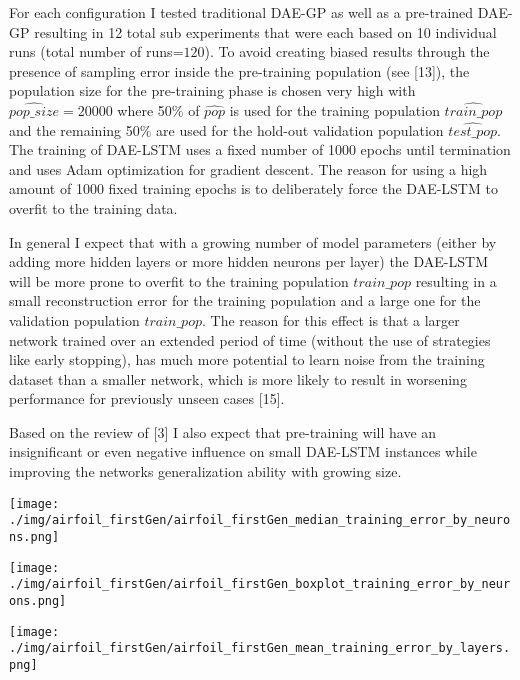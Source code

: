 \documentclass[
  11pt,
]{article}
\let\origfigure\figure
\let\endorigfigure\endfigure
\renewenvironment{figure}[1][2] {
    \expandafter\origfigure\expandafter[H]
} {
    \endorigfigure
}
\begin{document}
For each configuration I tested traditional DAE-GP as well as a
pre-trained DAE-GP resulting in 12 total sub experiments that were each
based on 10 individual runs (total number of runs=\(120\)). To avoid
creating biased results through the presence of sampling error inside
the pre-training population (see {[}13{]}), the population size for the
pre-training phase is chosen very high with \(\hat{pop\_size}=20000\)
where 50\% of \(\hat{pop}\) is used for the training population
\(\hat{train\_pop}\) and the remaining 50\% are used for the hold-out
validation population \(\hat{test\_pop}\). The training of DAE-LSTM uses
a fixed number of 1000 epochs until termination and uses Adam
optimization for gradient descent. The reason for using a high amount of
1000 fixed training epochs is to deliberately force the DAE-LSTM to
overfit to the training data.

In general I expect that with a growing number of model parameters
(either by adding more hidden layers or more hidden neurons per layer)
the DAE-LSTM will be more prone to overfit to the training population
\(train\_pop\) resulting in a small reconstruction error for the
training population and a large one for the validation population
\(train\_pop\). The reason for this effect is that a larger network
trained over an extended period of time (without the use of strategies
like early stopping), has much more potential to learn noise from the
training dataset than a smaller network, which is more likely to result
in worsening performance for previously unseen cases {[}15{]}.

Based on the review of {[}3{]} I also expect that pre-training will have
an insignificant or even negative influence on small DAE-LSTM instances
while improving the networks generalization ability with growing size.

\begin{figure}
\centering
\texttt{[image: ./img/airfoil\_firstGen/airfoil\_firstGen\_median\_training\_error\_by\_neurons.png]}
\caption{Airfoil - First Generation Median Training Error for variable
number of hidden Neurons}
\end{figure}

\begin{figure}
\centering
\texttt{[image: ./img/airfoil\_firstGen/airfoil\_firstGen\_boxplot\_training\_error\_by\_neurons.png]}
\caption{Airfoil - First Generation final Training Error for variable
number of hidden Neurons}
\end{figure}

\begin{figure}
\centering
\texttt{[image: ./img/airfoil\_firstGen/airfoil\_firstGen\_mean\_training\_error\_by\_layers.png]}
\caption{Airfoil - First Generation Median Training Error for variable
number of hidden Layers}
\end{figure}
\end{document}
